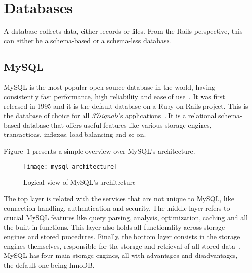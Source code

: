 \section{Databases} %
\label{tech:sec:databases}
A database collects data, either records or files. From the Rails perspective, this can either be a schema-based or a schema-less database.


\subsection{MySQL}
MySQL is the most popular open source database in the world, having consistently fast performance, high reliability and ease of use~\cite{why_mysql}. It was first released in 1995 and it is the default database on a Ruby on Rails project. This is the database of choice for all \textit{37signals}'s applications~\cite{interview_dhh}.  It is a relational schema-based database that offers useful features like various storage engines, transactions, indexes, load balancing and so on.

Figure~\ref{fig:mysql_architecture} presents a simple overview over MySQL's architecture.
\begin{figure}[h]
  \centering
    \texttt{[image: mysql\_architecture]}
  \caption{Logical view of MySQL's architecture}
  \label{fig:mysql_architecture}
\end{figure}
The top layer is related with the services that are not unique to MySQL, like connection handling, authentication and security. The middle layer refers to crucial MySQL features like query parsing, analysis, optimization, caching and all the built-in functions.  This layer also holds all functionality across storage engines and stored procedures. Finally, the bottom layer consists in the storage engines themselves, responsible for the storage and retrieval of all stored data~\cite{high_performance_mysql}. MySQL has four main storage engines, all with advantages and disadvantages, the default one being InnoDB.

